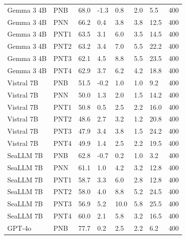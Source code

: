 \begin{tabular}{llllllll}
  Gemma 3 4B &     PNB &        68.0 & -1.3 &          0.8 &             2.0 &             5.5 & 400 \\
  Gemma 3 4B &     PNN &        66.2 &  0.4 &          3.8 &             3.8 &            12.5 & 400 \\
  Gemma 3 4B &    PNT1 &        63.5 &  3.1 &          6.0 &             3.5 &            14.5 & 400 \\
  Gemma 3 4B &    PNT2 &        63.2 &  3.4 &          7.0 &             5.5 &            22.2 & 400 \\
  Gemma 3 4B &    PNT3 &        62.1 &  4.5 &          8.8 &             5.5 &            23.5 & 400 \\
  Gemma 3 4B &    PNT4 &        62.9 &  3.7 &          6.2 &             4.2 &            18.8 & 400 \\
  Vistral 7B &     PNB &        51.5 & -0.2 &          1.0 &             1.0 &             9.2 & 400 \\
  Vistral 7B &     PNN &        50.0 &  1.3 &          2.0 &             1.5 &            14.2 & 400 \\
  Vistral 7B &    PNT1 &        50.8 &  0.5 &          2.5 &             2.2 &            16.0 & 400 \\
  Vistral 7B &    PNT2 &        48.6 &  2.7 &          3.2 &             1.2 &            20.8 & 400 \\
  Vistral 7B &    PNT3 &        47.9 &  3.4 &          3.8 &             1.5 &            24.2 & 400 \\
  Vistral 7B &    PNT4 &        49.9 &  1.4 &          2.5 &             2.2 &            19.5 & 400 \\
   SeaLLM 7B &     PNB &        62.8 & -0.7 &          0.2 &             1.0 &             3.2 & 400 \\
   SeaLLM 7B &     PNN &        61.1 &  1.0 &          4.2 &             3.2 &            12.8 & 400 \\
   SeaLLM 7B &    PNT1 &        58.7 &  3.3 &          6.0 &             2.8 &            12.8 & 400 \\
   SeaLLM 7B &    PNT2 &        58.0 &  4.0 &          8.8 &             5.2 &            24.5 & 400 \\
   SeaLLM 7B &    PNT3 &        56.9 &  5.2 &         10.0 &             5.8 &            25.5 & 400 \\
   SeaLLM 7B &    PNT4 &        60.0 &  2.1 &          5.8 &             3.2 &            16.5 & 400 \\
      GPT-4o &     PNB &        77.7 &  0.2 &          2.5 &             2.2 &             6.2 & 400 \\

\end{tabular}
